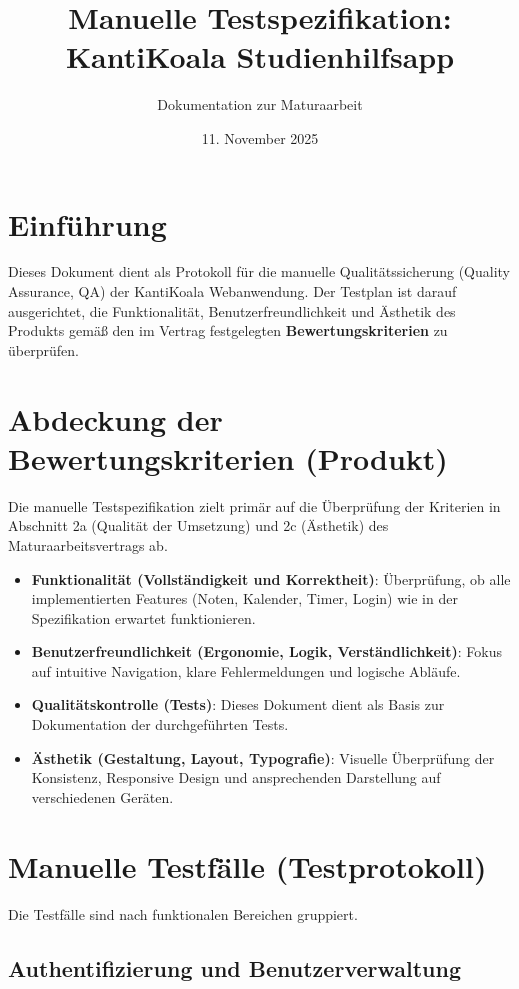 \documentclass[11pt, a4paper]{article}
\title{\textbf{Manuelle Testspezifikation: KantiKoala Studienhilfsapp}}
\author{Dokumentation zur Maturaarbeit}
\date{11. November 2025}
\begin{document}
\maketitle
\thispagestyle{empty}

\section{Einführung}
Dieses Dokument dient als Protokoll für die manuelle Qualitätssicherung (Quality Assurance, QA) der KantiKoala Webanwendung. Der Testplan ist darauf ausgerichtet, die Funktionalität, Benutzerfreundlichkeit und Ästhetik des Produkts gemäß den im Vertrag festgelegten \textbf{Bewertungskriterien} zu überprüfen.

\section{Abdeckung der Bewertungskriterien (Produkt)}
Die manuelle Testspezifikation zielt primär auf die Überprüfung der Kriterien in Abschnitt 2a (Qualität der Umsetzung) und 2c (Ästhetik) des Maturaarbeitsvertrags ab.

\begin{itemize}
    \item \textbf{Funktionalität (Vollständigkeit und Korrektheit)}: Überprüfung, ob alle implementierten Features (Noten, Kalender, Timer, Login) wie in der Spezifikation erwartet funktionieren.
    \item \textbf{Benutzerfreundlichkeit (Ergonomie, Logik, Verständlichkeit)}: Fokus auf intuitive Navigation, klare Fehlermeldungen und logische Abläufe.
    \item \textbf{Qualitätskontrolle (Tests)}: Dieses Dokument dient als Basis zur Dokumentation der durchgeführten Tests.
    \item \textbf{Ästhetik (Gestaltung, Layout, Typografie)}: Visuelle Überprüfung der Konsistenz, Responsive Design und ansprechenden Darstellung auf verschiedenen Geräten.
\end{itemize}

\section{Manuelle Testfälle (Testprotokoll)}

Die Testfälle sind nach funktionalen Bereichen gruppiert.

\subsection{Authentifizierung und Benutzerverwaltung}
\end{document}
